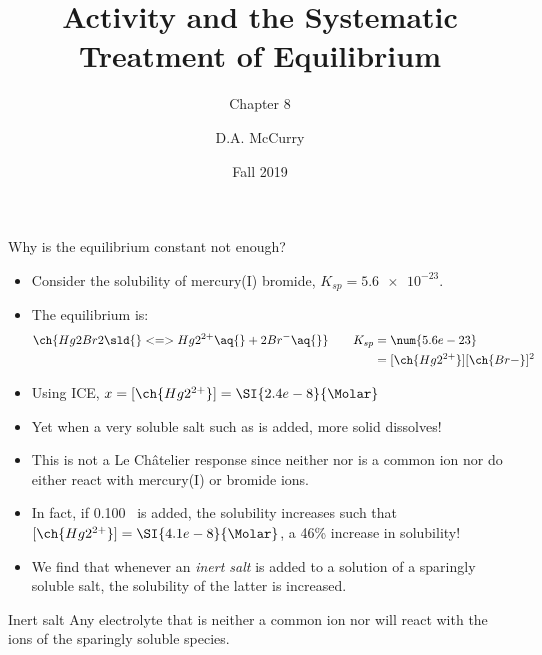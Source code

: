 \documentclass[notes=onlyslideswithnotes,notes=hide]{beamer}
\title{Activity and the Systematic Treatment of Equilibrium}
\subtitle{Chapter 8}
\institute{CHEM321 - Analytical Chemistry I \\ Bloomsburg University}
\author{D.A. McCurry}
\date{Fall 2019}
\begin{document}
\maketitle
{}

\begin{frame}[allowframebreaks=0.7]{Why is the equilibrium constant not enough?}
	\begin{itemize}
		\item Consider the solubility of mercury(I) bromide, $K_{sp} =
			\num{5.6e-23}$.
		\item The equilibrium is:
			\begin{align*}
				\ch{Hg2Br2\sld{} <=> Hg2^{2+}\aq{} + 2
				Br^{-}\aq{}}
				\qquad K_{sp} &= \num{5.6e-23} \\
				&= [\ch{Hg2^{2+}}][\ch{Br-}]^2
			\end{align*}
		\item Using ICE, $x = [\ch{Hg2^{2+}}] = \SI{2.4e-8}{\Molar}$
		\item Yet when a very soluble salt such as  is added,
			more solid dissolves!
		\item This is not a Le Ch\^atelier response since neither
			 nor  is a common ion nor do either
			react with mercury(I) or bromide ions.
		\item In fact, if \SI{0.100}{\Molar}~ is added, the
			solubility increases such that $[\ch{Hg2^{2+}}] =
			\SI{4.1e-8}{\Molar}$, a 46\% increase in solubility!
		\item We find that whenever an \emph{inert salt} is added to a
			solution of a sparingly soluble salt, the solubility of
			the latter is increased.
	\end{itemize}

	\begin{block}{Inert salt}
		Any electrolyte that is neither a common ion nor will react with
		the ions of the sparingly soluble species.
	\end{block}
\end{frame}
\end{document}
